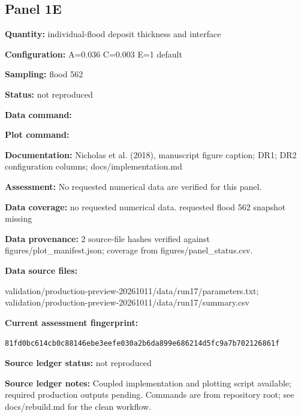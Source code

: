 \subsection*{Panel 1E}
\textbf{Quantity:} individual-flood deposit thickness and interface

\textbf{Configuration:} A=0.036 C=0.003 E=1 default

\textbf{Sampling:} flood 562

\textbf{Status:} not reproduced

\textbf{Data command:}\par {\small \texttt{}}\par

\textbf{Plot command:}\par {\small \texttt{}}\par

\textbf{Documentation:} Nicholas et al. (2018), manuscript figure caption; DR1; DR2 configuration columns; docs/\allowbreak{}implementation.md

\textbf{Assessment:} No requested numerical data are verified for this panel.

\textbf{Data coverage:} no requested numerical data. requested flood 562 snapshot missing

\textbf{Data provenance:} 2 source-file hashes verified against figures/\allowbreak{}plot\_\allowbreak{}manifest.json; coverage from figures/\allowbreak{}panel\_\allowbreak{}status.csv.

\textbf{Data source files:}\par {\small\raggedright validation/\allowbreak{}production-preview-20261011/\allowbreak{}data/\allowbreak{}run17/\allowbreak{}parameters.txt; validation/\allowbreak{}production-preview-20261011/\allowbreak{}data/\allowbreak{}run17/\allowbreak{}summary.csv\par}

\textbf{Current assessment fingerprint:}\par {\small\texttt{81fd0bc614cb0c88146ebe3eefe030a2b6da899e686214d5fc9a7b702126861f}}\par

\textbf{Source ledger status:} not reproduced

\textbf{Source ledger notes:} Coupled implementation and plotting script available; required production outputs pending. Commands are from repository root; see docs/\allowbreak{}rebuild.md for the clean workflow.

